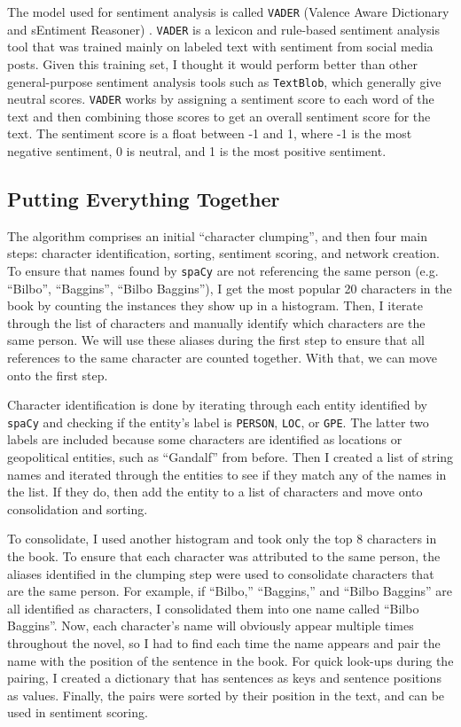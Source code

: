 \documentclass[stu,12pt,floatsintext]{apa7}
\newcommand{\code}[1]{\colorbox{light-gray}{\texttt{#1}}}
\begin{document}
The model used for sentiment analysis is called \code{VADER} (Valence Aware Dictionary and sEntiment Reasoner) \parencite{hutto2014vader}. \code{VADER} is a lexicon and rule-based sentiment analysis tool that was trained mainly on labeled text with sentiment from social media posts. Given this training set, I thought it would perform better than other general-purpose sentiment analysis tools such as \code{TextBlob}, which generally give neutral scores. \code{VADER} works by assigning a sentiment score to each word of the text and then combining those scores to get an overall sentiment score for the text. The sentiment score is a float between -1 and 1, where -1 is the most negative sentiment, 0 is neutral, and 1 is the most positive sentiment.

\subsection{Putting Everything Together}

The algorithm comprises an initial ``character clumping'', and then four main steps: character identification, sorting, sentiment scoring, and network creation. To ensure that names found by \code{spaCy} are not referencing the same person (e.g. ``Bilbo'', ``Baggins'', ``Bilbo Baggins''), I get the most popular 20 characters in the book by counting the instances they show up in a histogram. Then, I iterate through the list of characters and manually identify which characters are the same person. We will use these aliases during the first step to ensure that all references to the same character are counted together. With that, we can move onto the first step.

Character identification is done by iterating through each entity identified by \code{spaCy} and checking if the entity's label is \code{PERSON}, \code{LOC}, or \code{GPE}. The latter two labels are included because some characters are identified as locations or geopolitical entities, such as ``Gandalf'' from before. Then I created a list of string names and iterated through the entities to see if they match any of the names in the list. If they do, then add the entity to a list of characters and move onto consolidation and sorting.

To consolidate, I used another histogram and took only the top 8 characters in the book. To ensure that each character was attributed to the same person, the aliases identified in the clumping step were used to consolidate characters that are the same person. For example, if ``Bilbo,'' ``Baggins,'' and ``Bilbo Baggins'' are all identified as characters, I consolidated them into one name called ``Bilbo Baggins''. Now, each character's name will obviously appear multiple times throughout the novel, so I had to find each time the name appears and pair the name with the position of the sentence in the book. For quick look-ups during the pairing, I created a dictionary that has sentences as keys and sentence positions as values. Finally, the pairs were sorted by their position in the text, and can be used in sentiment scoring.
\end{document}
